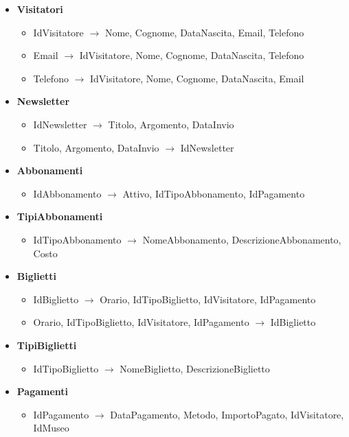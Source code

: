 \documentclass[a4paper, 12pt]{article}
\begin{document}
\begin{itemize}
    \item \textbf{Visitatori} 
        \begin{itemize}
            \item IdVisitatore $\rightarrow$ Nome, Cognome, DataNascita, Email, Telefono
            \item Email $\rightarrow$ IdVisitatore, Nome, Cognome, DataNascita, Telefono
            \item Telefono $\rightarrow$ IdVisitatore, Nome, Cognome, DataNascita, Email
        \end{itemize}
    \item \textbf{Newsletter} 
        \begin{itemize}
            \item IdNewsletter $\rightarrow$ Titolo, Argomento, DataInvio
            \item Titolo, Argomento, DataInvio $\rightarrow$ IdNewsletter
        \end{itemize}
    \item \textbf{Abbonamenti} 
        \begin{itemize}
            \item IdAbbonamento $\rightarrow$ Attivo, IdTipoAbbonamento, IdPagamento
        \end{itemize}
    \item \textbf{TipiAbbonamenti} 
        \begin{itemize}
            \item IdTipoAbbonamento $\rightarrow$ NomeAbbonamento, DescrizioneAbbonamento, Costo
        \end{itemize}
    \item \textbf{Biglietti} 
        \begin{itemize}
            \item IdBiglietto $\rightarrow$ Orario, IdTipoBiglietto, IdVisitatore, IdPagamento
            \item Orario, IdTipoBiglietto, IdVisitatore, IdPagamento $\rightarrow$ IdBiglietto
        \end{itemize}
    \item \textbf{TipiBiglietti} 
        \begin{itemize}
            \item IdTipoBiglietto $\rightarrow$ NomeBiglietto, DescrizioneBiglietto
        \end{itemize}
    \item \textbf{Pagamenti} 
        \begin{itemize}
            \item IdPagamento $\rightarrow$ DataPagamento, Metodo, ImportoPagato, IdVisitatore, IdMuseo
        \end{itemize}
\end{itemize}
\end{document}
